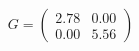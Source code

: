 \documentclass[preview]{standalone}
\begin{document}
\begin{align*}
G = \begin{pmatrix} 2.78 & 0.00 \\ 0.00 & 5.56 \end{pmatrix}
\end{align*}
\end{document}
